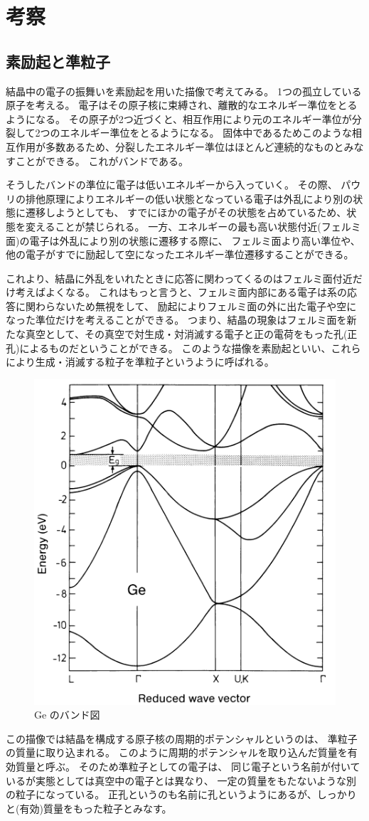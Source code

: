 \documentclass[11pt,dvipdfmx,a4paper]{jsarticle}
\numberwithin{equation}{section}
\begin{document}
\clearpage
\section{考察}
\subsection{素励起と準粒子}
結晶中の電子の振舞いを素励起を用いた描像で考えてみる。
1つの孤立している原子を考える。
電子はその原子核に束縛され、離散的なエネルギー準位をとるようになる。
その原子が2つ近づくと、相互作用により元のエネルギー準位が分裂して2つのエネルギー準位をとるようになる。
固体中であるためこのような相互作用が多数あるため、分裂したエネルギー準位はほとんど連続的なものとみなすことができる。
これがバンドである。

そうしたバンドの準位に電子は低いエネルギーから入っていく。
その際、
パウリの排他原理によりエネルギーの低い状態となっている電子は外乱により別の状態に遷移しようとしても、
すでにほかの電子がその状態を占めているため、状態を変えることが禁じられる。
一方、エネルギーの最も高い状態付近(フェルミ面)の電子は外乱により別の状態に遷移する際に、
フェルミ面より高い準位や、他の電子がすでに励起して空になったエネルギー準位遷移することができる。

これより、結晶に外乱をいれたときに応答に関わってくるのはフェルミ面付近だけ考えばよくなる。
これはもっと言うと、フェルミ面内部にある電子は系の応答に関わらないため無視をして、
励起によりフェルミ面の外に出た電子や空になった準位だけを考えることができる。
つまり、結晶の現象はフェルミ面を新たな真空として、その真空で対生成・対消滅する電子と正の電荷をもった孔(正孔)によるものだということができる。
このような描像を素励起といい、これらにより生成・消滅する粒子を準粒子というように呼ばれる。

\begin{figure}
	\centering
	\includegraphics[width=0.4\columnwidth]{graph/graph01.png}
	\caption{Ge のバンド図\cite{ibach-luth}}
	\label{graph:01}
\end{figure}
この描像では結晶を構成する原子核の周期的ポテンシャルというのは、
準粒子の質量に取り込まれる。
このように周期的ポテンシャルを取り込んだ質量を有効質量と呼ぶ。
そのため準粒子としての電子は、
同じ電子という名前が付いているが実態としては真空中の電子とは異なり、
一定の質量をもたないような別の粒子になっている。
正孔というのも名前に孔というようにあるが、しっかりと(有効)質量をもった粒子とみなす。
\end{document}
